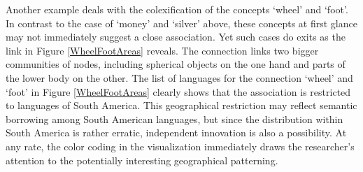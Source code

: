 Another example deals with the colexification of the concepts `wheel' and `foot'. In contrast to the case of `money' and `silver' above, these concepts at first glance may not immediately suggest a close association. Yet such cases do exits as the link in Figure \ref{WheelFootAreas} reveals. The connection links two bigger communities of nodes, including spherical objects on the one hand and parts of the lower body on the other. The list of languages for the connection `wheel' and `foot' in Figure \ref{WheelFootAreas} clearly shows that the association is restricted to languages of South America. 
This geographical restriction may reflect semantic borrowing among South American languages, but since the distribution within South America is rather erratic, independent innovation is also a possibility. At any rate, the color coding in the visualization immediately draws the researcher's attention to the potentially interesting geographical patterning.



